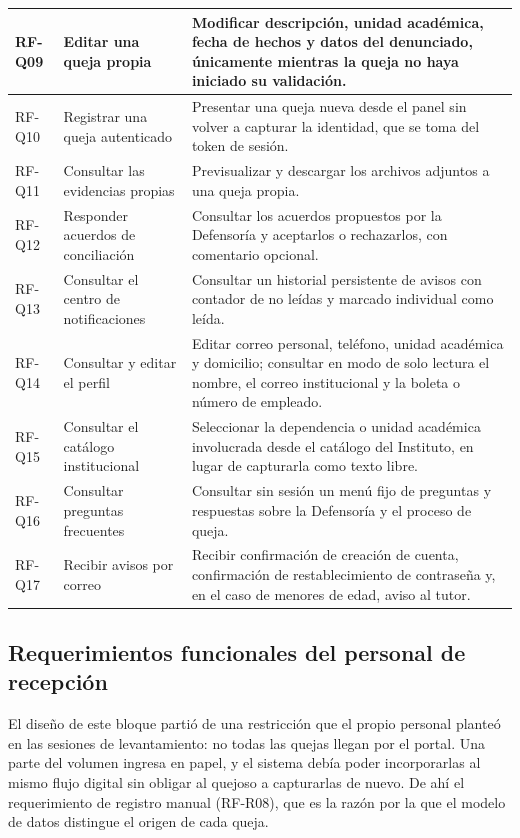 \begin{longtable}{|L{1.7cm}|L{4.0cm}|L{9.9cm}|}
		RF-Q09 & Editar una queja propia & Modificar descripción, unidad académica, fecha de hechos
		y datos del denunciado, únicamente mientras la queja no haya iniciado su validación.
		\\ \hline
	
		RF-Q10 & Registrar una queja autenticado & Presentar una queja nueva desde el panel sin
		volver a capturar la identidad, que se toma del token de sesión. \\ \hline
	
		RF-Q11 & Consultar las evidencias propias & Previsualizar y descargar los archivos adjuntos
		a una queja propia. \\ \hline
	
		RF-Q12 & Responder acuerdos de conciliación & Consultar los acuerdos propuestos por la
		Defensoría y aceptarlos o rechazarlos, con comentario opcional. \\ \hline
	
		RF-Q13 & Consultar el centro de notificaciones & Consultar un historial persistente de
		avisos con contador de no leídas y marcado individual como leída. \\ \hline
	
		RF-Q14 & Consultar y editar el perfil & Editar correo personal, teléfono, unidad académica y
		domicilio; consultar en modo de solo lectura el nombre, el correo institucional y la boleta o
		número de empleado. \\ \hline
	
		RF-Q15 & Consultar el catálogo institucional & Seleccionar la dependencia o unidad académica
		involucrada desde el catálogo del Instituto, en lugar de capturarla como texto libre.
		\\ \hline
	
		RF-Q16 & Consultar preguntas frecuentes & Consultar sin sesión un menú fijo de preguntas y
		respuestas sobre la Defensoría y el proceso de queja. \\ \hline
	
		RF-Q17 & Recibir avisos por correo & Recibir confirmación de creación de cuenta, confirmación
		de restablecimiento de contraseña y, en el caso de menores de edad, aviso al tutor.
		\\ \hline
	\end{longtable}
	
	\normalsize
	
	\subsection{Requerimientos funcionales del personal de recepción}
	El diseño de este bloque partió de una restricción que el propio personal planteó en las
	sesiones de levantamiento: no todas las quejas llegan por el portal. Una parte del volumen
	ingresa en papel, y el sistema debía poder incorporarlas al mismo flujo digital sin obligar al
	quejoso a capturarlas de nuevo. De ahí el requerimiento de registro manual (RF-R08), que es la
	razón por la que el modelo de datos distingue el origen de cada queja.
	

